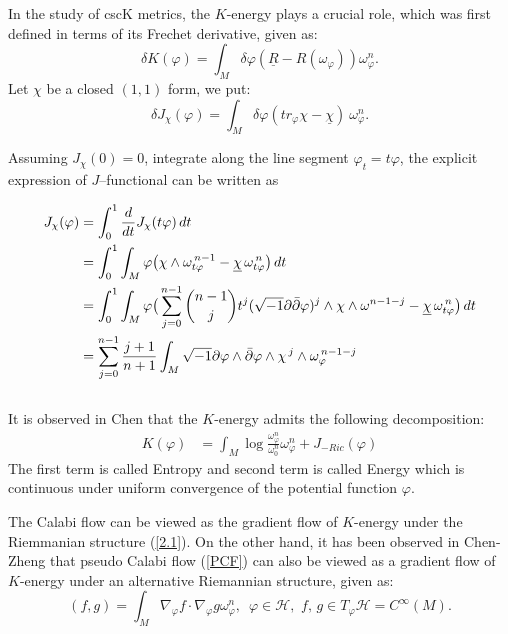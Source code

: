 \documentclass[11pt]{amsart}
\numberwithin{equation}{section}
\begin{document}
In the study of cscK metrics,  the $K$-energy plays a crucial role,  which was first defined in terms of its Frechet derivative,  given as:
\begin{equation*}
\delta K(\varphi)=\int_M\delta\varphi(\underline{R}-R(\omega_{\varphi}))\omega_{\varphi}^n.
\end{equation*}
Let $\chi$ be a closed $(1,1)$ form,  we put:
\begin{equation*}
\delta J_{\chi}(\varphi) = \int_M \delta \varphi (tr_\varphi\chi - \underline \chi)\ \omega_\varphi^n.
\end{equation*}

Assuming $J_{\chi}(0)=0$, integrate along the line segment $\varphi_t = t\varphi$, the explicit expression of $J$--functional can be written as 





\begin{align}
	J_\chi(\varphi) &= \int_0^1 \frac{d}{dt}J_\chi(t\varphi)\,dt  \notag\\
	&=\int_0^1 \int_M \varphi \big(\chi \wedge \omega_{t\varphi}^{\,n-1} - \underline \chi\, \omega_{t\varphi}^{\,n}\big)\, dt \notag\\
	&=\int_0^1 \int_M \varphi \big( \sum_{j=0}^{n-1} \binom{n-1}{j} t^j (\sqrt{-1}\partial\bar\partial\varphi)^{j} \wedge \chi \wedge \omega^{n-1-j} - \underline \chi\, \omega_{t\varphi}^{\,n}\big)\, dt \notag\\ 
	&= \sum_{j=0}^{n-1} \frac{j+1}{n+1} \int_M \sqrt{-1}\partial\varphi\wedge\bar\partial\varphi \wedge \chi^{\,j} \wedge \omega_\varphi^{\,n-1-j} 
\end{align}\\

It is observed in Chen \cite{chen00} that the $K$-energy admits the following decomposition:
\begin{align}
	K(\varphi) &=\int_M \log\frac{\omega_{\varphi}^n}{\omega_0^n} \omega_\varphi^n +J_{-Ric}(\varphi)
\end{align}
The first term is called Entropy and second term is called Energy which is continuous under uniform convergence of the potential function $\varphi$. 

The Calabi flow can be viewed as the gradient flow of $K$-energy under the Riemmanian structure (\ref{2.1}).  On the other hand,  it has been observed in Chen-Zheng \cite{Chen-Zheng} that pseudo Calabi flow (\ref{PCF}) can also be viewed as a gradient flow of $K$-energy under an alternative Riemannian structure,  given as:
\begin{equation*}
(f,g)=\int_M\nabla_{\varphi}f\cdot\nabla_{\varphi}g\omega_{\varphi}^n,\,\,\,\varphi\in \mathcal{H},\,\,f,\,g\in T_{\varphi}\mathcal{H}=C^{\infty}(M).
\end{equation*}
\end{document}
